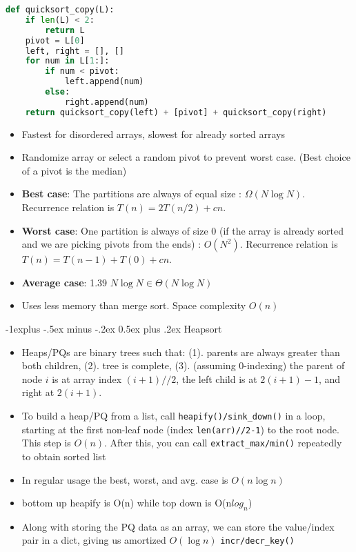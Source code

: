\documentclass[letterpaper, 8pt]{extarticle}
\makeatletter
\renewcommand{\subsection}{\@startsection{subsection}{2}{0mm}%
                                {-1explus -.5ex minus -.2ex}%
                                {0.5ex plus .2ex}%
                                {\normalfont\small\bfseries}}
\newcommand\ttt\texttt
\makeatother
\begin{document}
\begin{multicols*}{5}
\begin{lstlisting}[language=Python, breaklines=true, postbreak=\mbox{\textcolor{red}{$\hookrightarrow$}\space}]
def quicksort_copy(L):
    if len(L) < 2:
        return L
    pivot = L[0]
    left, right = [], []
    for num in L[1:]:
        if num < pivot:
            left.append(num)
        else:
            right.append(num)
    return quicksort_copy(left) + [pivot] + quicksort_copy(right)
 \end{lstlisting}
  \begin{itemize}
    \item Fastest for disordered arrays, slowest for already sorted arrays
    \item Randomize array or select a random pivot to prevent worst case. (Best choice of a pivot is the median)
    \item \textbf{Best case}: The partitions are always of equal size : $\Omega(N \log N)$. Recurrence relation is $T(n) = 2T(n/2) + cn$.
    \item \textbf{Worst case}: One partition is always of size 0 (if the array is already sorted and we are picking pivots from the ends) : $O(N^2)$. Recurrence relation is $T(n) = T(n - 1) + T(0) + cn$.
    \item \textbf{Average case}: 1.39 $N\log{N} \in \Theta(N \log N)$
    \item Uses less memory than merge sort. Space complexity $O(n)$
  \end{itemize}

\subsection{Heapsort}
\begin{itemize}
    \item Heaps/PQs are binary trees such that: (1). parents are always greater than both children, (2). tree is complete, (3). (assuming 0-indexing) the parent of node $i$ is at array index $(i+1)//2$, the left child is at $2(i+1)-1$, and right at $2(i+1)$.
    \item To build a heap/PQ from a list, call \ttt{heapify()/sink\_down()} in a loop, starting at the first non-leaf node (index \ttt{len(arr)//2-1}) to the root node. This step is $O(n)$. After this, you can call \ttt{extract\_max/min()} repeatedly to obtain sorted list
    \item In regular usage the best, worst, and avg. case is $O(n\log n)$
    \item bottom up heapify is O(n) while top down is O(n$log_n$)
    \item Along with storing the PQ data as an array, we can store the value/index pair in a dict, giving us amortized $O(\log n)$ \ttt{incr/decr\_key()}
\end{itemize}


\end{multicols*}
\end{document}

